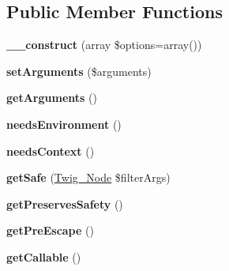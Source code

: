 \subsection*{Public Member Functions}
\begin{DoxyCompactItemize}
\item 
\hypertarget{class_twig___filter_a2d2b2afcd896367c740d1eb4b486614b}{}{\bfseries \+\_\+\+\_\+construct} (array \$options=array())\label{class_twig___filter_a2d2b2afcd896367c740d1eb4b486614b}

\item 
\hypertarget{class_twig___filter_a2b7df0e0f61ee886144db2d59fc0d7da}{}{\bfseries set\+Arguments} (\$arguments)\label{class_twig___filter_a2b7df0e0f61ee886144db2d59fc0d7da}

\item 
\hypertarget{class_twig___filter_a1d4c324c5a088be98d99d3efbf3502e1}{}{\bfseries get\+Arguments} ()\label{class_twig___filter_a1d4c324c5a088be98d99d3efbf3502e1}

\item 
\hypertarget{class_twig___filter_a711311882c7dd1058f92f7eb0e8edeeb}{}{\bfseries needs\+Environment} ()\label{class_twig___filter_a711311882c7dd1058f92f7eb0e8edeeb}

\item 
\hypertarget{class_twig___filter_a52c35bc6da8861f40aa59f1b99f7ef0f}{}{\bfseries needs\+Context} ()\label{class_twig___filter_a52c35bc6da8861f40aa59f1b99f7ef0f}

\item 
\hypertarget{class_twig___filter_acc5701ec146ba15919020bbc42941632}{}{\bfseries get\+Safe} (\hyperlink{class_twig___node}{Twig\+\_\+\+Node} \$filter\+Args)\label{class_twig___filter_acc5701ec146ba15919020bbc42941632}

\item 
\hypertarget{class_twig___filter_a7fc1becef9ade703f0c381e579d5a879}{}{\bfseries get\+Preserves\+Safety} ()\label{class_twig___filter_a7fc1becef9ade703f0c381e579d5a879}

\item 
\hypertarget{class_twig___filter_a4b7863ed7e994206f25a6c84cbc59116}{}{\bfseries get\+Pre\+Escape} ()\label{class_twig___filter_a4b7863ed7e994206f25a6c84cbc59116}

\item 
\hypertarget{class_twig___filter_a0be839e0782a38a172c386bd963375c9}{}{\bfseries get\+Callable} ()\label{class_twig___filter_a0be839e0782a38a172c386bd963375c9}

\end{DoxyCompactItemize}
